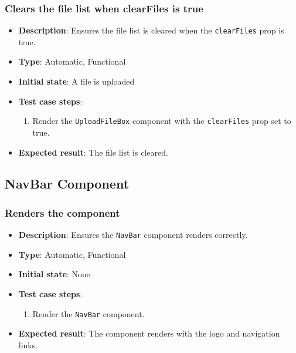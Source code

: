 \documentclass[12pt, titlepage]{article}
\begin{document}
\subsubsection{Clears the file list when clearFiles is true}
\begin{itemize}
    \item \textbf{Description}: Ensures the file list is cleared when the \texttt{clearFiles} prop is true.
    \item \textbf{Type}: Automatic, Functional
    \item \textbf{Initial state}: A file is uploaded
    \item \textbf{Test case steps}:
    \begin{enumerate}
        \item Render the \texttt{UploadFileBox} component with the \texttt{clearFiles} prop set to true.
    \end{enumerate}
    \item \textbf{Expected result}: The file list is cleared.
\end{itemize}

\subsection{NavBar Component}
\subsubsection{Renders the component}
\begin{itemize}
    \item \textbf{Description}: Ensures the \texttt{NavBar} component renders correctly.
    \item \textbf{Type}: Automatic, Functional
    \item \textbf{Initial state}: None
    \item \textbf{Test case steps}:
    \begin{enumerate}
        \item Render the \texttt{NavBar} component.
    \end{enumerate}
    \item \textbf{Expected result}: The component renders with the logo and navigation links.
    
\end{itemize}
\end{document}
